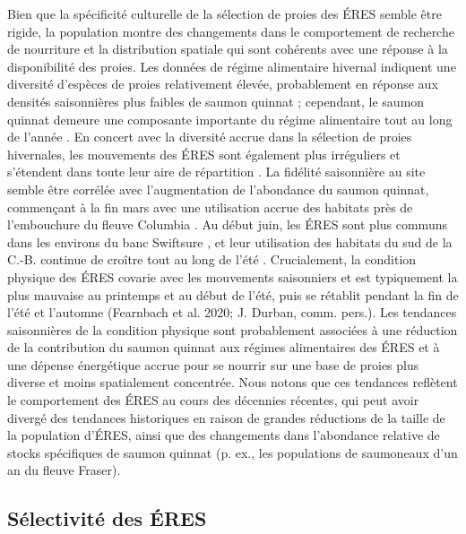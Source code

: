 Bien que la spécificité culturelle de la sélection de proies des ÉRES semble être rigide, la population montre des changements dans le comportement de recherche de nourriture et la distribution spatiale qui sont cohérents avec une réponse à la disponibilité des proies. Les données de régime alimentaire hivernal indiquent une diversité d'espèces de proies relativement élevée, probablement en réponse aux densités saisonnières plus faibles de saumon quinnat \citep{hansonEndangeredPredatorsEndangered2021} ; cependant, le saumon quinnat demeure une composante importante du régime alimentaire tout au long de l'année \citep{vanciseSpatialSeasonalForaging2024}. En concert avec la diversité accrue dans la sélection de proies hivernales, les mouvements des ÉRES sont également plus irréguliers et s'étendent dans toute leur aire de répartition \citep{hansonAssessingMovementsOccurrence2017}. La fidélité saisonnière au site semble être corrélée avec l'augmentation de l'abondance du saumon quinnat, commençant à la fin mars avec une utilisation accrue des habitats près de l'embouchure du fleuve Columbia \citep{zamonWinterObservationsSouthern2007, hansonAssessingMovementsOccurrence2017}. Au début juin, les ÉRES sont plus communs dans les environs du banc Swiftsure \citep{thorntonSouthernResidentKiller2022}, et leur utilisation des habitats du sud de la C.-B. continue de croître tout au long de l'été \citep{ettingerShiftingPhenologyEndangered2022, stewartTraditionalSummerHabitat2023}. Crucialement, la condition physique des ÉRES covarie avec les mouvements saisonniers et est typiquement la plus mauvaise au printemps et au début de l'été, puis se rétablit pendant la fin de l'été et l'automne (Fearnbach et al. 2020; J. Durban, comm. pers.). Les tendances saisonnières de la condition physique sont probablement associées à une réduction de la contribution du saumon quinnat aux régimes alimentaires des ÉRES et à une dépense énergétique accrue pour se nourrir sur une base de proies plus diverse et moins spatialement concentrée. Nous notons que ces tendances reflètent le comportement des ÉRES au cours des décennies récentes, qui peut avoir divergé des tendances historiques en raison de grandes réductions de la taille de la population d'ÉRES, ainsi que des changements dans l'abondance relative de stocks spécifiques de saumon quinnat (p. ex., les populations de saumoneaux d'un an du fleuve Fraser).

\subsection{Sélectivité des ÉRES}

